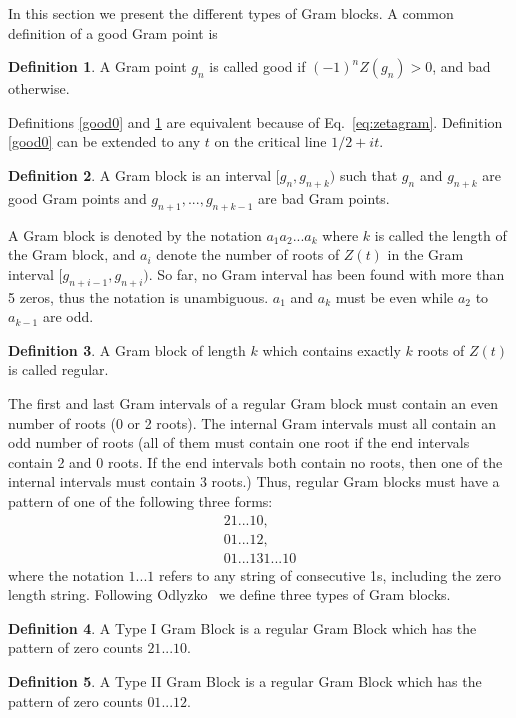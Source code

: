 \documentclass[twoside]{article}
\theoremstyle{definition}
\newtheorem{defn}{Definition}
\begin{document}
In this section we present the different types of Gram blocks. A common definition of a good Gram point is
\begin{defn}\label{good1}
A Gram point $g_n$ is called good if $(-1)^nZ(g_n) > 0$, and bad otherwise.
\end{defn}
Definitions \ref{good0} and \ref{good1} are equivalent because of Eq.~\ref{eq:zetagram}. Definition \ref{good0}  can be extended to any {$t$} on the critical line $1/2+it$. 
{
\begin{defn}\label{gramblock}
A Gram block is an interval $[g_n, g_{n+k})$ such that $g_n$  and $g_{n+k}$ are good Gram points 
and $g_{n+1}, . . ., g_{n+k-1}$ are bad Gram points. 
\end{defn}
}
A Gram block is denoted by the notation $a_1a_2 . . . a_k$ where $k$ is called the length of the Gram block, and $a_i$ denote the number of roots of $Z(t)$ in the Gram interval $[g_{n+i-1}, g_{n+i})$. So far, no Gram interval has been found with more than 5 zeros, thus the notation is unambiguous. $a_1$ and $a_k$ must be even while  $a_2$ to $a_{k-1}$ are odd.
{
\begin{defn}\label{regulargramblock}
A Gram block of length $k$ which contains exactly $k$ roots of {$Z(t)$} is called regular. 
\end{defn}
}
The first and last Gram intervals of a regular Gram block must contain an even number of roots (0 or 2 roots). 
The internal Gram intervals must all contain an odd number of roots (all of them must contain one root if the end intervals contain 2 and 0 roots. If the end intervals both contain no roots, then one of the internal intervals must contain 3 roots.) 
Thus, regular Gram blocks must have a pattern of one of the following three forms:
\begin{eqnarray}
21 . . . 10,\nonumber\\
 01 . . . 12,\nonumber \\
 01 . . . 131 . . . 10
\label{types}
\end{eqnarray}
where the notation $1 . . . 1$ refers to any string of consecutive 1s, including the zero length string. 
Following Odlyzko~\cite{Odlyzko 1992} we define three types of Gram blocks.  
\begin{defn}\label{gramblockI}
A Type I Gram Block is a regular Gram Block which has the pattern of zero counts $21...10$.
\end{defn}
\begin{defn}\label{gramblockII}
A Type II Gram Block is a regular Gram Block which has the pattern of zero counts $01 . . . 12$.
\end{defn}
\end{document}

